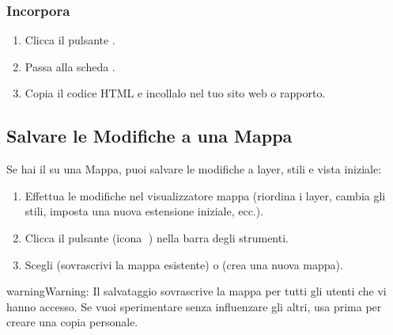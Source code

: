 \documentclass[letterpaper,10pt,english]{sphinxmanual}
\begin{document}
\subsubsection{Incorpora}
\label{\detokenize{it/04_esplorare_mappe:incorpora}}\begin{enumerate}
%
\item {} 
\sphinxAtStartPar
Clicca il pulsante .

\item {} 
\sphinxAtStartPar
Passa alla scheda .

\item {} 
\sphinxAtStartPar
Copia il codice HTML  e incollalo nel tuo sito web o rapporto.

\end{enumerate}


\subsection{Salvare le Modifiche a una Mappa}
\label{\detokenize{it/04_esplorare_mappe:salvare-le-modifiche-a-una-mappa}}
\sphinxAtStartPar
Se hai il  su una Mappa, puoi salvare le modifiche a layer,
stili e vista iniziale:
\begin{enumerate}
%
\item {} 
\sphinxAtStartPar
Effettua le modifiche nel visualizzatore mappa (riordina i layer, cambia gli stili,
imposta una nuova estensione iniziale, ecc.).

\item {} 
\sphinxAtStartPar
Clicca il pulsante  (icona 💾) nella barra degli strumenti.

\item {} 
\sphinxAtStartPar
Scegli  (sovrascrivi la mappa esistente) o  (crea una nuova mappa).

\end{enumerate}

\begin{sphinxadmonition}{warning}{Warning:}
\sphinxAtStartPar
Il salvataggio sovrascrive la mappa per tutti gli utenti che vi hanno accesso.
Se vuoi sperimentare senza influenzare gli altri, usa prima  per
creare una copia personale.
\end{sphinxadmonition}
\end{document}
